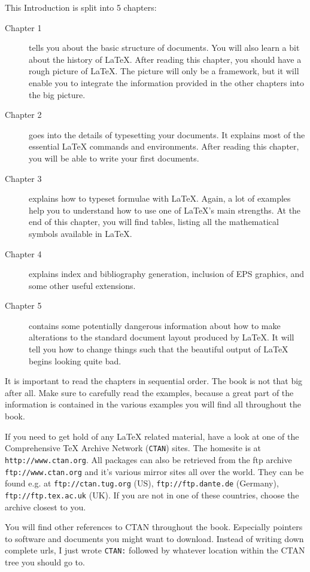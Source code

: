 \noindent This Introduction is split into 5 chapters:
\begin{description}
\item[Chapter 1] tells you about the basic structure of \LaTeXe{}
  documents. You will also learn a bit about the history of \LaTeX{}.
  After reading this chapter, you should have a rough picture of
  \LaTeX{}. The picture will only be a framework, but it will enable
  you to integrate the information provided in the other chapters into
  the big picture.
\item[Chapter 2] goes into the details of typesetting your
  documents. It explains most of the essential \LaTeX{} commands and
  environments. After reading this chapter, you will be able to write
  your first documents. 
\item[Chapter 3] explains how to typeset formulae with \LaTeX. Again, a
  lot of examples help you to understand how to use one of \LaTeX{}'s
  main strengths. At the end of this chapter, you will find tables, listing
  all the mathematical symbols available in \LaTeX{}.
\item[Chapter 4] explains index and  bibliography generation,
  inclusion of EPS graphics, and some other useful extensions.
\item[Chapter 5] contains some potentially dangerous information about
  how to make alterations to the
  standard document layout produced by \LaTeX{}. It will tell you how  to
  change things such that the beautiful output of \LaTeX{}
  begins looking quite bad.
\end{description}
\bigskip
It is important to read the chapters in sequential order. The book is
not that big after all. Make sure to carefully read the examples,
because a great part of the information is contained in the various
examples you will find all throughout the book.

\bigskip
\noindent If you need to get hold of any \LaTeX{} related material, 
have a look at one of the Comprehensive \TeX{} Archive Network
(\texttt{CTAN}) sites. The homesite is at
\texttt{http://www.ctan.org}. All packages can also be retrieved from
the ftp archive \texttt{ftp://www.ctan.org} and it's various mirror
sites all over the world.  They can be found e.g.{} at
\texttt{ftp://ctan.tug.org} (US), \texttt{ftp://ftp.dante.de}
(Germany), \texttt{ftp://ftp.tex.ac.uk} (UK).  If you are not in one
of these countries, choose the archive closest to you.

You will find other references to CTAN throughout the book. Especially
pointers to software and documents you might want to download. Instead
of writing down complete urls, I just wrote \texttt{CTAN:} followed by
whatever location within the CTAN tree you should go to. 

